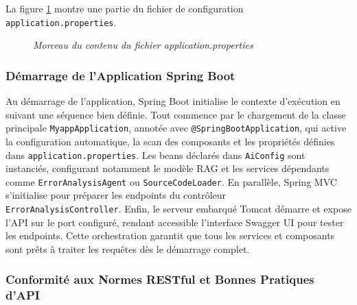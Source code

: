 \documentclass[12pt,a4paper]{report}
\begin{document}
	La figure \ref{fig:properties} montre une partie du fichier de configuration \verb|application.properties|.
	
	\begin{figure}[H]
		\centering
		\caption{\textit{Morceau du contenu du fichier application.properties}}
		\label{fig:properties}
	\end{figure}
	
	\subsubsection{Démarrage de l'Application Spring Boot}
	
	Au démarrage de l'application, Spring Boot initialise le contexte d'exécution en suivant une séquence bien définie. Tout commence par le chargement de la classe principale \verb|MyappApplication|, annotée avec \verb|@SpringBootApplication|, qui active la configuration automatique, la scan des composants et les propriétés définies dans \verb|application.properties|. Les beans déclarés dans \verb|AiConfig| sont instanciés, configurant notamment le modèle RAG et les services dépendants comme \verb|ErrorAnalysisAgent| ou \verb|SourceCodeLoader|. En parallèle, Spring MVC s'initialise pour préparer les endpoints du contrôleur \\ \verb|ErrorAnalysisController|. Enfin, le serveur embarqué Tomcat démarre et expose l'API sur le port configuré, rendant accessible l'interface Swagger UI pour tester les endpoints. Cette orchestration garantit que tous les services et composants sont prêts à traiter les requêtes dès le démarrage complet.
	
	\subsubsection{Conformité aux Normes RESTful et Bonnes Pratiques d'API}
	
\end{document}
